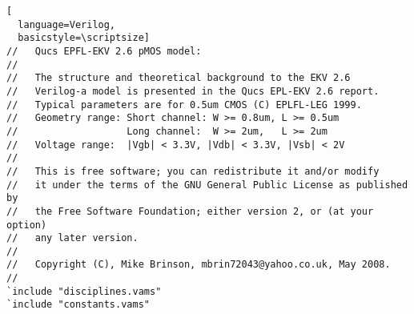 
\begin{lstlisting}[
  language=Verilog,
  basicstyle=\scriptsize]
//   Qucs EPFL-EKV 2.6 pMOS model:
//
//   The structure and theoretical background to the EKV 2.6
//   Verilog-a model is presented in the Qucs EPL-EKV 2.6 report.
//   Typical parameters are for 0.5um CMOS (C) EPLFL-LEG 1999.
//   Geometry range: Short channel: W >= 0.8um, L >= 0.5um
//                   Long channel:  W >= 2um,   L >= 2um
//   Voltage range:  |Vgb| < 3.3V, |Vdb| < 3.3V, |Vsb| < 2V
//
//   This is free software; you can redistribute it and/or modify
//   it under the terms of the GNU General Public License as published by
//   the Free Software Foundation; either version 2, or (at your option)
//   any later version.
// 
//   Copyright (C), Mike Brinson, mbrin72043@yahoo.co.uk, May 2008.
//
`include "disciplines.vams"
`include "constants.vams"


\end{lstlisting}
